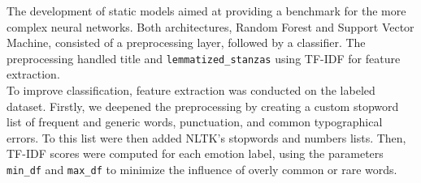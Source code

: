 

The development of static models aimed at providing a benchmark for the
more complex neural networks.
Both architectures, Random Forest and Support Vector Machine, consisted of a preprocessing layer, followed by a classifier.
The preprocessing handled title and \texttt{lemmatized\_stanzas} using TF-IDF for feature
extraction.\\

To improve classification, feature extraction was conducted on the labeled dataset. 
Firstly, we deepened the preprocessing by creating a custom stopword list of frequent and generic words, punctuation, and common typographical errors. To this list were then added NLTK's stopwords and numbers lists.
Then, TF-IDF scores were computed for each emotion label, using the parameters \texttt{min\_df} and \texttt{max\_df} to minimize the influence of overly common or rare words. \\

